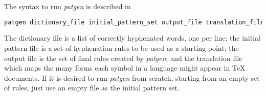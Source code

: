 
The syntax to run \emph{patgen} is described in 
\begin{lstlisting}[language={bash}, basicstyle=\small\ttfamily, caption={Syntax to run patgen.}, label={lst-patgen-syntax}]
patgen dictionary_file initial_pattern_set output_file translation_file
\end{lstlisting}

The dictionary file is a list of correctly hyphenated words, one per line; 
the initial pattern file is a set of hyphenation rules to be used as a starting point;
the output file is the set of final rules created by \emph{patgen}; and the translation file
which maps the many forms each symbol in a language might appear in \TeX{} documents.
If it is desired to run \emph{patgen} from scratch, starting from an empty set of rules,
just use an empty file as the initial pattern set.



